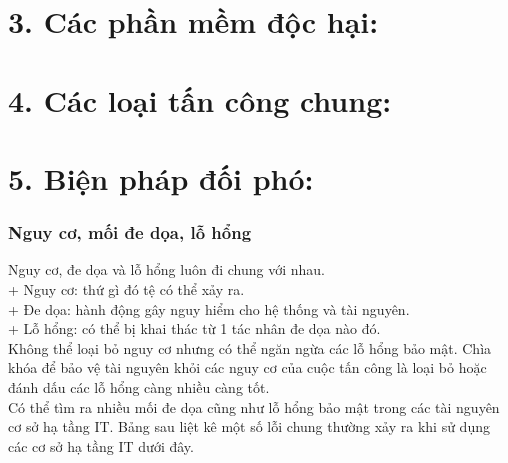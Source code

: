 \documentclass{beamer}
\begin{document}
\section{3.	Các phần mềm độc hại:} %
\section{4.	Các loại tấn công chung:} %
\section{5.	Biện pháp đối phó:} %
\begin{frame}
\frametitle{Nguy cơ, mối đe dọa, lỗ hổng}
Nguy cơ, đe dọa và lỗ hổng luôn đi chung với nhau.\\
+ Nguy cơ: thứ gì đó tệ có thể xảy ra.\\
+ Đe dọa: hành động gây nguy hiểm cho hệ thống và tài nguyên.\\
+ Lỗ hổng: có thể bị khai thác từ 1 tác nhân đe dọa nào đó.\\
Không thể loại bỏ nguy cơ nhưng có thể ngăn ngừa các lỗ hổng bảo mật.	Chìa khóa để bảo vệ tài nguyên khỏi các nguy cơ của cuộc tấn công là loại bỏ hoặc đánh dấu các lỗ hổng càng nhiều càng tốt.\\
Có thể tìm ra nhiều mối đe dọa cũng như lỗ hổng bảo mật trong các tài nguyên cơ sở hạ tầng IT. Bảng sau liệt kê một số lỗi chung thường xảy ra khi sử dụng các cơ sở hạ tầng IT dưới đây.

\end{frame}
\end{document}
